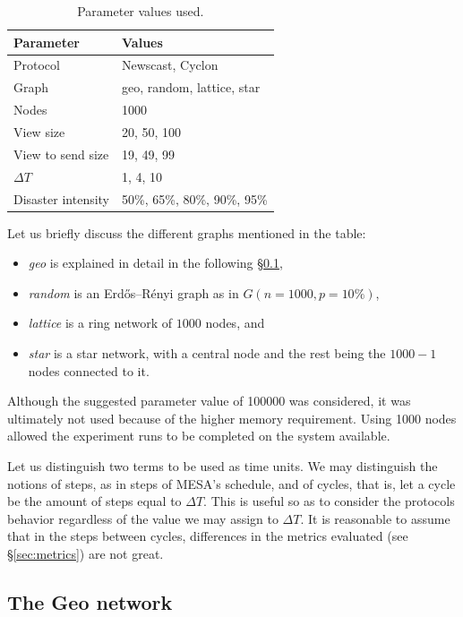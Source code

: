 \documentclass[a4paper]{ifacconf}
\newcommand{\DT}{\ensuremath{{\Delta}T}}
\begin{document}
\begin{table}
    \centering\begin{tabular}{ll}
        Parameter & Values\\
        \hline
        Protocol & Newscast, Cyclon \\
        Graph & geo, random, lattice, star \\
        Nodes & \num{1000} \\
        View size & 20, 50, 100 \\
        View to send size & 19, 49, 99 \\
        \DT & 1, 4, 10 \\
        Disaster intensity & 50\%, 65\%, 80\%, 90\%, 95\% \\
    \end{tabular}
    \caption{Parameter values used.}
    \label{tab:parameters}
\end{table}

Let us briefly discuss the different graphs mentioned in the table:

\begin{itemize}
    \item \emph{geo} is explained in detail in the following \S\ref{sec:geo},
    \item \emph{random} is an Erdős–Rényi graph as in $G(n = 1000, p = 10\%)$,
    \item \emph{lattice} is a ring network of $1000$ nodes, and
    \item \emph{star} is a star network, with a central node and the rest being the $1000 - 1$ nodes connected to it.
\end{itemize}

Although the suggested parameter value of \num{100000} was considered, it was ultimately not used because of the higher memory requirement.
Using 1000 nodes allowed the experiment runs to be completed on the system available.

Let us distinguish two terms to be used as time units. 
We may distinguish the notions of steps, as in steps of MESA's schedule, and of cycles, that is, let a cycle be the amount of steps equal to \DT.
This is useful so as to consider the protocols behavior regardless of the value we may assign to \DT.
It is reasonable to assume that in the steps between cycles, differences in the metrics evaluated (see \S\ref{sec:metrics}) are not great.

\subsection{The Geo network}\label{sec:geo}
\end{document}

